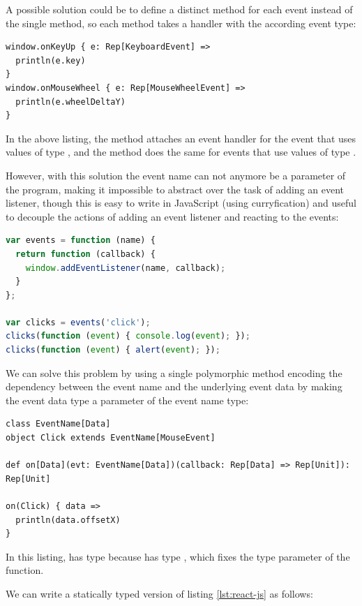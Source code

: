 \documentclass[runningheads,a4paper]{llncs}
\begin{document}
A possible solution could be to define a distinct method for each event instead of the single
 method, so each method takes a handler with the according event type:

\begin{lstlisting}
window.onKeyUp { e: Rep[KeyboardEvent] =>
  println(e.key)
}
window.onMouseWheel { e: Rep[MouseWheelEvent] =>
  println(e.wheelDeltaY)
}
\end{lstlisting}

In the above listing, the  method attaches an event handler for the  event
that uses values of type , and the  method does the same for
 events that use values of type .

However, with this solution the event name can not anymore be a parameter of the program, making it
impossible to abstract over the task of adding an event listener, though this is easy to write in
JavaScript (using curryfication) and useful to decouple the actions of adding an event
listener and reacting to the events:

\begin{lstlisting}[language=JavaScript,label=react-js]
var events = function (name) {
  return function (callback) {
    window.addEventListener(name, callback);
  }
};

var clicks = events('click');
clicks(function (event) { console.log(event); });
clicks(function (event) { alert(event); });
\end{lstlisting}

We can solve this problem by using a single polymorphic method encoding the dependency between the
event name and the underlying event data by making the event data type a parameter of the event name
type:

\begin{lstlisting}
class EventName[Data]
object Click extends EventName[MouseEvent]

def on[Data](evt: EventName[Data])(callback: Rep[Data] => Rep[Unit]): Rep[Unit]

on(Click) { data =>
  println(data.offsetX)
}
\end{lstlisting}

In this listing,  has type  because  has type
, which fixes the  type parameter of the  function.

We can write a statically typed version of listing \ref{lst:react-js} as follows:
\end{document}
